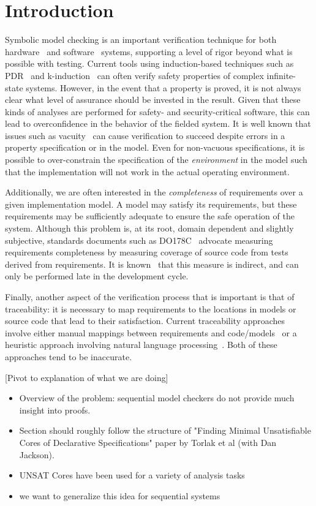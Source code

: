 \section{Introduction}
\label{sec:intro}

Symbolic model checking is an important verification technique for both hardware~\cite{} and software~\cite{SoftwareModelCheckingTakesOff} systems, supporting a level of rigor beyond what is possible with testing.  Current tools using induction-based techniques such as PDR~\cite{} and k-induction~\cite{} can often verify safety properties of complex infinite-state systems.  However, in the event that a property is proved, it is not always clear what level of assurance should be invested in the result.  Given that these kinds of analyses are performed for safety- and security-critical software, this can lead to overconfidence in the behavior of the fielded system.  It is well known that issues such as vacuity~\cite{} can cause verification to succeed despite errors in a property specification or in the model. Even for non-vacuous specifications, it is possible to over-constrain the specification of the {\em environment} in the model such that the implementation will not work in the actual operating environment.

Additionally, we are often interested in the {\em completeness} of requirements over a given implementation model.  A model may satisfy its requirements, but these requirements may be sufficiently adequate to ensure the safe operation of the system.  Although this problem is, at its root, domain dependent and slightly subjective, standards documents such as DO178C~\cite{} advocate measuring requirements completeness by measuring coverage of source code from tests derived from requirements.  It is known~\cite{ISSTA2006} that this measure is indirect, and can only be performed late in the development cycle.

Finally, another aspect of the verification process that is important is that of traceability: it is necessary to map requirements to the locations in models or source code that lead to their satisfaction. Current traceability approaches involve either manual mappings between requirements and code/models~\cite{} or a heuristic approach involving natural language processing~\cite{}.  Both of these approaches tend to be inaccurate.

[Pivot to explanation of what we are doing]

\begin{itemize}
    \item Overview of the problem: sequential model checkers do not provide much insight into proofs.
    \item Section should roughly follow the structure of "Finding Minimal Unsatisfiable Cores of
        Declarative Specifications" paper by Torlak et al (with Dan Jackson).
    \item UNSAT Cores have been used for a variety of analysis tasks
    \item we want to generalize this idea for sequential systems
\end{itemize}

  